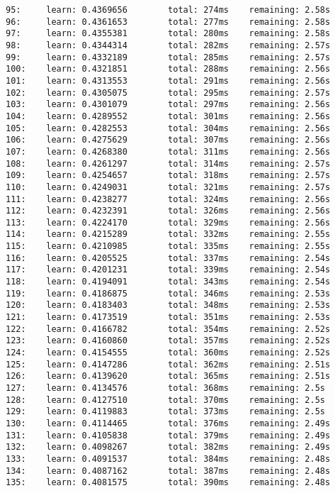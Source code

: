 \documentclass[11pt]{article}
\begin{document}
\begin{Verbatim}[commandchars=\\\{\}]
95:     learn: 0.4369656        total: 274ms    remaining: 2.58s
96:     learn: 0.4361653        total: 277ms    remaining: 2.58s
97:     learn: 0.4355381        total: 280ms    remaining: 2.58s
98:     learn: 0.4344314        total: 282ms    remaining: 2.57s
99:     learn: 0.4332189        total: 285ms    remaining: 2.57s
100:    learn: 0.4321851        total: 288ms    remaining: 2.56s
101:    learn: 0.4313553        total: 291ms    remaining: 2.56s
102:    learn: 0.4305075        total: 295ms    remaining: 2.57s
103:    learn: 0.4301079        total: 297ms    remaining: 2.56s
104:    learn: 0.4289552        total: 301ms    remaining: 2.56s
105:    learn: 0.4282553        total: 304ms    remaining: 2.56s
106:    learn: 0.4275629        total: 307ms    remaining: 2.56s
107:    learn: 0.4268380        total: 311ms    remaining: 2.56s
108:    learn: 0.4261297        total: 314ms    remaining: 2.57s
109:    learn: 0.4254657        total: 318ms    remaining: 2.57s
110:    learn: 0.4249031        total: 321ms    remaining: 2.57s
111:    learn: 0.4238277        total: 324ms    remaining: 2.56s
112:    learn: 0.4232391        total: 326ms    remaining: 2.56s
113:    learn: 0.4224170        total: 329ms    remaining: 2.56s
114:    learn: 0.4215289        total: 332ms    remaining: 2.55s
115:    learn: 0.4210985        total: 335ms    remaining: 2.55s
116:    learn: 0.4205525        total: 337ms    remaining: 2.54s
117:    learn: 0.4201231        total: 339ms    remaining: 2.54s
118:    learn: 0.4194091        total: 343ms    remaining: 2.54s
119:    learn: 0.4186875        total: 346ms    remaining: 2.53s
120:    learn: 0.4183403        total: 348ms    remaining: 2.53s
121:    learn: 0.4173519        total: 351ms    remaining: 2.53s
122:    learn: 0.4166782        total: 354ms    remaining: 2.52s
123:    learn: 0.4160860        total: 357ms    remaining: 2.52s
124:    learn: 0.4154555        total: 360ms    remaining: 2.52s
125:    learn: 0.4147286        total: 362ms    remaining: 2.51s
126:    learn: 0.4139620        total: 365ms    remaining: 2.51s
127:    learn: 0.4134576        total: 368ms    remaining: 2.5s
128:    learn: 0.4127510        total: 370ms    remaining: 2.5s
129:    learn: 0.4119883        total: 373ms    remaining: 2.5s
130:    learn: 0.4114465        total: 376ms    remaining: 2.49s
131:    learn: 0.4105838        total: 379ms    remaining: 2.49s
132:    learn: 0.4098267        total: 382ms    remaining: 2.49s
133:    learn: 0.4091537        total: 384ms    remaining: 2.48s
134:    learn: 0.4087162        total: 387ms    remaining: 2.48s
135:    learn: 0.4081575        total: 390ms    remaining: 2.48s

\end{Verbatim}
\end{document}
